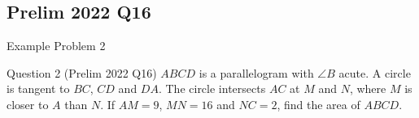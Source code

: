 \documentclass{beamer}
\begin{document}
\subsection{Prelim 2022 Q16}
\begin{frame}{Example Problem 2}
	\begin{center}
		\begin{minipage}{0.9\textwidth}
			\begin{block}{Question 2}
				(Prelim 2022 Q16) $ABCD$ is a parallelogram with $\angle B$ acute. A circle is tangent to $BC$, $CD$ and $DA$. The circle intersects $AC$ at $M$ and $N$, where $M$ is closer to $A$ than $N$. If $AM = 9$, $MN = 16$ and $NC = 2$, find the area of $ABCD$.
			\end{block}
			\pause
			\begin{center}
			\end{center}
		\end{minipage}
	\end{center}
\end{frame}
\end{document}
